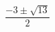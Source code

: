 \documentclass[preview]{standalone}
\begin{document}
\begin{align*}
\dfrac{-3 \pm \sqrt{13} }{2}
\end{align*}
\end{document}
